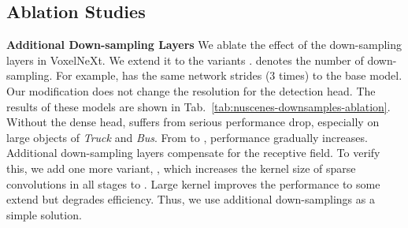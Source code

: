 \documentclass[10pt,twocolumn,letterpaper]{article}
\begin{document}
{\subsection{Ablation Studies}
\noindent
\textbf{Additional Down-sampling Layers}
We ablate the effect of the down-sampling layers in VoxelNeXt.
We extend it to the variants .  denotes the number of down-sampling. For example,  has the same network strides (3 times) to the base model. Our modification does not change the resolution for the detection head. 
The results of these models are shown in Tab.~\ref{tab:nuscenes-downsamples-ablation}. Without the dense head,  suffers from serious performance drop, especially on large objects of {\em Truck} and {\em Bus}. From  to , performance gradually increases. Additional down-sampling layers compensate for the receptive field. To verify this, we add one more variant, , which increases the kernel size of sparse convolutions in all stages to . Large kernel improves the performance to some extend but degrades efficiency. 
Thus, we use additional down-samplings as a simple solution.

}
\end{document}
